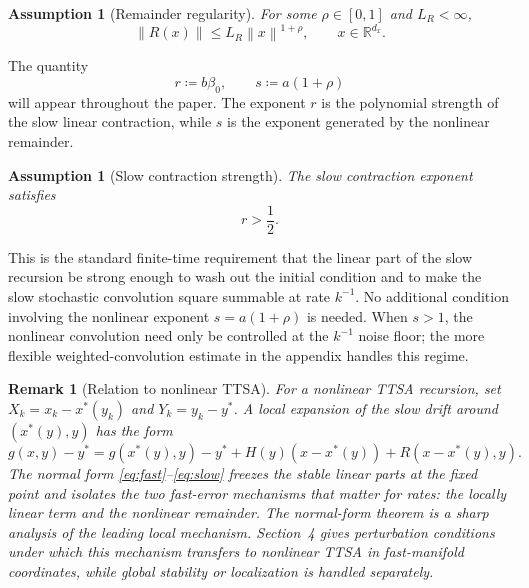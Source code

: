 \documentclass{article}
\newtheorem{assumption}[theorem]{Assumption}
\newtheorem{remark}[theorem]{Remark}
\newcommand{\R}{\mathbb{R}}
\newcommand{\norm}[1]{\left\lVert #1\right\rVert}
\begin{document}
\begin{assumption}[Remainder regularity]\label{ass:remainder}
For some $\rho\in[0,1]$ and $L_R<\infty$,
\begin{equation}
  \norm{R(x)}\le L_R\norm{x}^{1+\rho},\qquad x\in\R^{d_x}. \label{eq:remainder}
\end{equation}
\end{assumption}

The quantity
\begin{equation}
  r\coloneqq b\beta_0,
  \qquad
  s\coloneqq a(1+\rho) \label{eq:rs-def}
\end{equation}
will appear throughout the paper. The exponent $r$ is the polynomial strength of the slow linear contraction, while $s$ is the exponent generated by the nonlinear remainder.

\begin{assumption}[Slow contraction strength]\label{ass:strength}
The slow contraction exponent satisfies
\begin{equation}
  r>\frac12. \label{eq:r-condition}
\end{equation}
\end{assumption}

This is the standard finite-time requirement that the linear part of the slow recursion be strong enough to wash out the initial condition and to make the slow stochastic convolution square summable at rate $k^{-1}$. No additional condition involving the nonlinear exponent $s=a(1+\rho)$ is needed. When $s>1$, the nonlinear convolution need only be controlled at the $k^{-1}$ noise floor; the more flexible weighted-convolution estimate in the appendix handles this regime.

\begin{remark}[Relation to nonlinear TTSA]
For a nonlinear TTSA recursion, set $X_k=x_k-x^*(y_k)$ and $Y_k=y_k-y^*$. A local expansion of the slow drift around $(x^*(y),y)$ has the form
\[
  g(x,y)-y^* = g(x^*(y),y)-y^* + H(y)(x-x^*(y)) + R(x-x^*(y),y).
\]
The normal form \eqref{eq:fast}--\eqref{eq:slow} freezes the stable linear parts at the fixed point and isolates the two fast-error mechanisms that matter for rates: the locally linear term and the nonlinear remainder. The normal-form theorem is a sharp analysis of the leading local mechanism. Section~4 gives perturbation conditions under which this mechanism transfers to nonlinear TTSA in fast-manifold coordinates, while global stability or localization is handled separately.
\end{remark}
\end{document}
